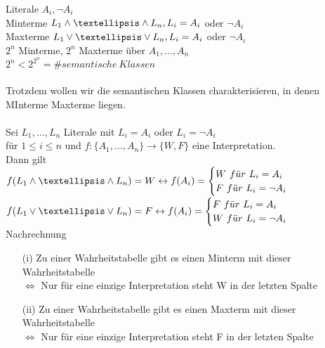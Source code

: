 

\noindent
Literale $A_i, \neg A_i$\\
Minterme $L_1 \AND … \AND L_n, L_i = A_i$ oder $\neg A_i$\\
Maxterme $L_1 \OR … \OR L_n, L_i = A_i$ oder $ \neg A_i$\\

\noindent
$2^n$ Minterme, $2^n$ Maxterme über $A_1, …, A_n$\\
$2^n < 2^{2^n} = \# semantische\ Klassen$\\
\noindent\\
Trotzdem wollen wir die semantischen Klassen charakterisieren, in denen MInterme Maxterme liegen.\\

\\
Sei $L_1, …, L_n$ Literale mit $L_i = A_i$ oder $L_i = \neg A_i$\\
für $1 \leq i \leq n$ und $f: \{A_1, …, A_n\} \rightarrow \{W, F\}$ eine Interpretation.\\
Dann gilt\\
$f(L_1 \AND … \AND L_n) = W \leftrightarrow f(A_i) = \begin{cases} W\ f\ddot{u}r\ L_i = A_i \\ F\ f\ddot{u}r\ L_i = \neg A_i \end{cases}$\\
$f(L_1 \OR … \OR L_n) = F \leftrightarrow f(A_i) = \begin{cases} F\ f\ddot{u}r\ L_i = A_i \\ W\ f\ddot{u}r\ L_i = \neg A_i \end{cases}$\\

\beweis{} Nachrechnung

\begin{enumerate}
\item[(i)] Zu einer Wahrheitstabelle gibt es einen Minterm mit dieser Wahrheitstabelle \\
$\Leftrightarrow$ Nur für eine einzige Interpretation steht W in der letzten Spalte 

\item[(ii)] Zu einer Wahrheitstabelle gibt es einen Maxterm mit dieser Wahrheitstabelle \\
$\Leftrightarrow$ Nur für eine einzige Interpretation steht F in der letzten Spalte
\end{enumerate}

